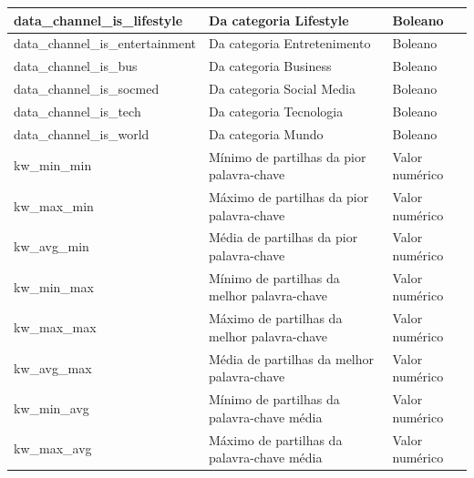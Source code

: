 \begin{table}
{\begin{tabular}{|l|l|l|}
data\_channel\_is\_lifestyle     & Da categoria Lifestyle                                                                        & Boleano        \\ \hline
data\_channel\_is\_entertainment & Da categoria Entretenimento                                                                   & Boleano        \\ \hline
data\_channel\_is\_bus           & Da categoria Business                                                                         & Boleano        \\ \hline
data\_channel\_is\_socmed        & Da categoria Social Media                                                                     & Boleano        \\ \hline
data\_channel\_is\_tech          & Da categoria Tecnologia                                                                       & Boleano        \\ \hline
data\_channel\_is\_world         & Da categoria Mundo                                                                            & Boleano        \\ \hline
kw\_min\_min                     & Mínimo de partilhas da pior palavra-chave                                                     & Valor numérico \\ \hline
kw\_max\_min                     & Máximo de partilhas da pior palavra-chave                                                     & Valor numérico \\ \hline
kw\_avg\_min                     & Média de partilhas da pior palavra-chave                                                      & Valor numérico \\ \hline
kw\_min\_max                     & Mínimo de partilhas da melhor palavra-chave                                                   & Valor numérico \\ \hline
kw\_max\_max                     & Máximo de partilhas da melhor palavra-chave                                                   & Valor numérico \\ \hline
kw\_avg\_max                     & Média de partilhas da melhor palavra-chave                                                    & Valor numérico \\ \hline
kw\_min\_avg                     & Mínimo de partilhas da palavra-chave média                                                    & Valor numérico \\ \hline
kw\_max\_avg                     & Máximo de partilhas da palavra-chave média                                                    & Valor numérico \\ \hline

\end{tabular}}
\end{table}
